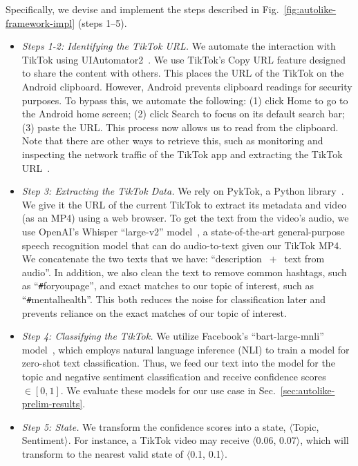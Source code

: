 Specifically, we devise and implement the steps described in Fig.~\ref{fig:autolike-framework-impl} (steps 1--5). 
\begin{itemize} 
    \item \textit{Steps 1-2: Identifying the TikTok URL.} We automate the interaction with TikTok using UIAutomator2~\cite{uiautomator2}. We use TikTok's Copy URL feature designed to share the content with others. This places the URL of the TikTok on the Android clipboard. However, Android prevents clipboard readings for security purposes. To bypass this, we automate the following: (1) click Home to go to the Android home screen; (2) click Search to focus on its default search bar; (3) paste the URL. This process now allows us to read from the clipboard. Note that there are other ways to retrieve this, such as monitoring and inspecting the network traffic of the TikTok app and extracting the TikTok URL~\cite{KaplanTikTok}.
    \item \textit{Step 3: Extracting the TikTok Data.} We rely on PykTok, a Python library~\cite{pyktok}. We give it the URL of the current TikTok to extract its metadata and video (as an MP4) using a web browser. To get the text from the video's audio, we use OpenAI's Whisper ``large-v2'' model~\cite{openaiwhisper}, a state-of-the-art general-purpose speech recognition model that can do audio-to-text given our TikTok MP4. We concatenate the two texts that we have: ``description $\ +\ $ text from audio''. In addition, we also clean the text to remove common hashtags, such as ``\verb|#|foryoupage'', and exact matches to our topic of interest, such as ``\verb|#|mentalhealth''. This both reduces the noise for classification later and prevents reliance on the exact matches of our topic of interest.
    \item \textit{Step 4: Classifying the TikTok.} We utilize Facebook's ``bart-large-mnli'' model~\cite{bart-large-mnli}, which employs natural language inference (NLI) to train a model for zero-shot text classification. Thus, we feed our text into the model for the topic and negative sentiment classification and receive confidence scores $\in [0, 1]$. We evaluate these models for our use case in Sec.~\ref{sec:autolike-prelim-results}. 
    \item \textit{Step 5: State.} We transform the confidence scores into a state, $\langle$Topic, Sentiment$\rangle$. For instance, a TikTok video may receive $\langle$0.06, 0.07$\rangle$, which will transform to the nearest valid state of $\langle$0.1, 0.1$\rangle$. %
\end{itemize}


